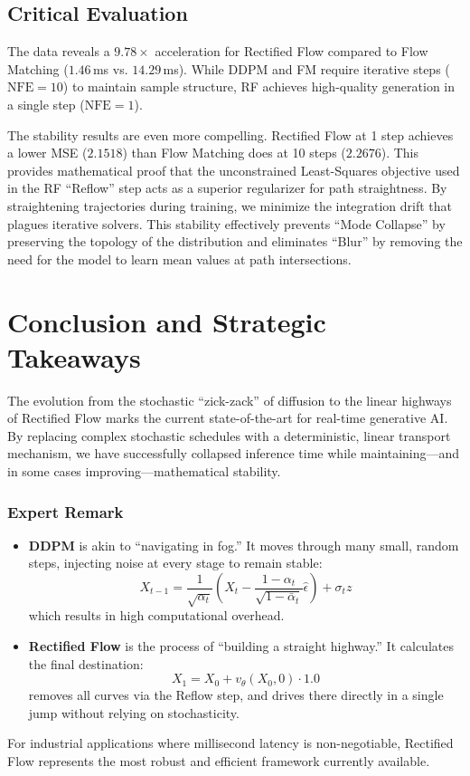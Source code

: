 \documentclass[11pt,a4paper]{article}
\begin{document}
\subsection{Critical Evaluation}
The data reveals a $9.78\times$ acceleration for Rectified Flow compared to Flow Matching ($1.46$\,ms vs. $14.29$\,ms). While DDPM and FM require iterative steps ($\text{NFE}=10$) to maintain sample structure, RF achieves high-quality generation in a single step ($\text{NFE}=1$).

The stability results are even more compelling. Rectified Flow at 1 step achieves a lower MSE ($2.1518$) than Flow Matching does at 10 steps ($2.2676$). This provides mathematical proof that the unconstrained Least-Squares objective used in the RF ``Reflow'' step acts as a superior regularizer for path straightness. By straightening trajectories during training, we minimize the integration drift that plagues iterative solvers. This stability effectively prevents ``Mode Collapse'' by preserving the topology of the distribution and eliminates ``Blur'' by removing the need for the model to learn mean values at path intersections.

\section{Conclusion and Strategic Takeaways}
The evolution from the stochastic ``zick-zack'' of diffusion to the linear highways of Rectified Flow marks the current state-of-the-art for real-time generative AI. By replacing complex stochastic schedules with a deterministic, linear transport mechanism, we have successfully collapsed inference time while maintaining---and in some cases improving---mathematical stability.

\vspace{0.4cm}
\noindent\hrulefill
\vspace{0.2cm}

\subsubsection*{Expert Remark}
\begin{itemize}
    \item \textbf{DDPM} is akin to ``navigating in fog.'' It moves through many small, random steps, injecting noise at every stage to remain stable:
    \begin{equation}
    X_{t-1} = \frac{1}{\sqrt{\alpha_t}} \left( X_t - \frac{1-\alpha_t}{\sqrt{1-\bar{\alpha}_t}} \hat{\epsilon} \right) + \sigma_t z
    \end{equation}
    which results in high computational overhead.
    \item \textbf{Rectified Flow} is the process of ``building a straight highway.'' It calculates the final destination:
    \begin{equation}
    X_1 = X_0 + v_\theta(X_0, 0) \cdot 1.0
    \end{equation}
    removes all curves via the Reflow step, and drives there directly in a single jump without relying on stochasticity.
\end{itemize}
For industrial applications where millisecond latency is non-negotiable, Rectified Flow represents the most robust and efficient framework currently available.
\end{document}
